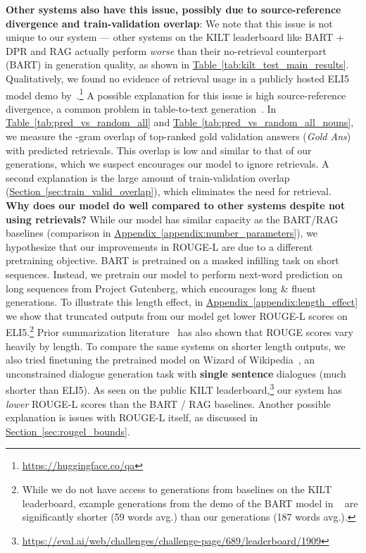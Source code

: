 \documentclass[11pt]{article}
\newcommand{\namedref}[2]{\hyperref[#2]{#1~\ref*{#2}}}
\newcommand{\sectionref}[1]{\namedref{Section}{#1}}
\newcommand{\tableref}[1]{\namedref{Table}{#1}}
\newcommand{\appendixref}[1]{\namedref{Appendix}{#1}}
\begin{document}
\noindent \textbf{Other systems also have this issue, possibly due to source-reference divergence and train-validation overlap}: We note that this issue is not unique to our system --- other systems on the KILT leaderboard like BART + DPR and RAG actually perform \emph{worse} than their no-retrieval counterpart (BART) in generation quality, as shown in \tableref{tab:kilt_test_main_results}. Qualitatively, we found no evidence of retrieval usage in a publicly hosted ELI5 model demo by~\citet{jernite2020}.\footnote{\url{https://huggingface.co/qa}} A possible explanation for this issue is high source-reference divergence, a common problem in table-to-text generation~\citep{wiseman2017challenges, tian2019sticking}. In \tableref{tab:pred_vs_random_all} and \tableref{tab:pred_vs_random_all_nouns}, we measure the -gram overlap of top-ranked gold validation answers (\emph{Gold Ans}) with predicted retrievals. This overlap is low and similar to that of our generations, which we suspect encourages our model to ignore retrievals. A second explanation is the large amount of train-validation overlap (\sectionref{sec:train_valid_overlap}), which eliminates the need for retrieval.\\


\noindent \textbf{Why does our model do well compared to other systems despite not using retrievals?} While our model has similar capacity as the BART/RAG baselines (comparison in \appendixref{appendix:number_parameters}), we hypothesize that our improvements in ROUGE-L are due to a different pretraining objective. BART is pretrained on a masked infilling task on short sequences. Instead, we pretrain our model to perform next-word prediction on long sequences from Project Gutenberg,  which encourages long \& fluent generations. To illustrate this length effect, in \appendixref{appendix:length_effect} we show that truncated outputs from our model get lower ROUGE-L scores on ELI5.\footnote{While we do not have access to generations from baselines on the KILT leaderboard, example generations from the demo of the BART model in ~\citet{jernite2020} are significantly shorter (59 words avg.) than our generations (187 words avg.).} Prior summarization literature~\citep{sun2019compare} has also shown that ROUGE scores vary heavily by length. To compare the same systems on shorter length outputs, we also tried finetuning the pretrained model on Wizard of Wikipedia~\citep{dinan2019wizard}, an unconstrained dialogue generation task with \textbf{single sentence} dialogues (much shorter than ELI5). As seen on the public KILT leaderboard,\footnote{\url{https://eval.ai/web/challenges/challenge-page/689/leaderboard/1909}} our system has \emph{lower} ROUGE-L scores than the BART / RAG baselines. Another possible explanation is issues with ROUGE-L itself, as discussed in \sectionref{sec:rougel_bounds}.\\
\end{document}
